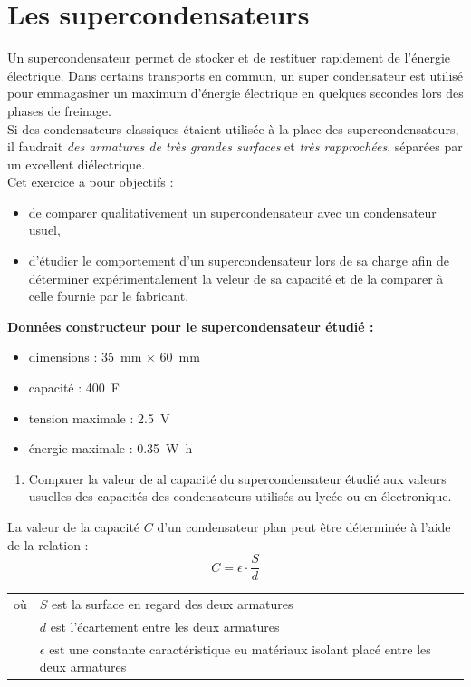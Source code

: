 \documentclass[a4paper,11pt,fleqn]{article}%
\begin{document}
	\maketitle
	
	\section{Les supercondensateurs}
	Un supercondensateur permet de stocker et de restituer rapidement de l'énergie électrique. Dans certains transports en commun, un super condensateur est utilisé pour emmagasiner un maximum d'énergie électrique en quelques secondes lors des phases de freinage.\\
	Si des condensateurs classiques étaient utilisée à la place des supercondensateurs, il faudrait  \emph{des armatures de très grandes surfaces} et \emph{très rapprochées}, séparées par un excellent diélectrique.\\
	Cet exercice a pour objectifs :
	\begin{itemize}
		\item  de comparer qualitativement un supercondensateur avec un condensateur usuel,
		\item d'étudier le comportement d'un supercondensateur lors de sa charge afin de déterminer expérimentalement la veleur de sa capacité et de la comparer à celle fournie par le fabricant.
	\end{itemize}
	\textbf{Données constructeur pour le supercondensateur étudié :}
	\begin{itemize}[label = $>$]
		\item dimensions : \SI{35}{\milli\meter} $\times$ \SI{60}{\milli\meter}
		\item capacité : \SI{400}{\farad}
		\item tension maximale : \SI{2,5}{\volt}
		\item énergie maximale : \SI{0,35}{\watt\hour}
	\end{itemize}
	
	\begin{enumerate}
		\item Comparer la valeur de al capacité du supercondensateur étudié aux valeurs usuelles des capacités des condensateurs utilisés au lycée ou en électronique.
	\end{enumerate}
	
	La valeur de la capacité $C$ d'un condensateur plan peut être déterminée à l'aide de la relation : $$C =\epsilon \cdot \dfrac{S}{d}$$
	\begin{tabular}{c|l}
		où & $S$ est la surface en regard des deux armatures\\
		& $d$ est l'écartement entre les deux armatures\\
		& $\epsilon$ est une constante caractéristique eu matériaux isolant placé entre les deux armatures\\
	\end{tabular}
	
\end{document}

